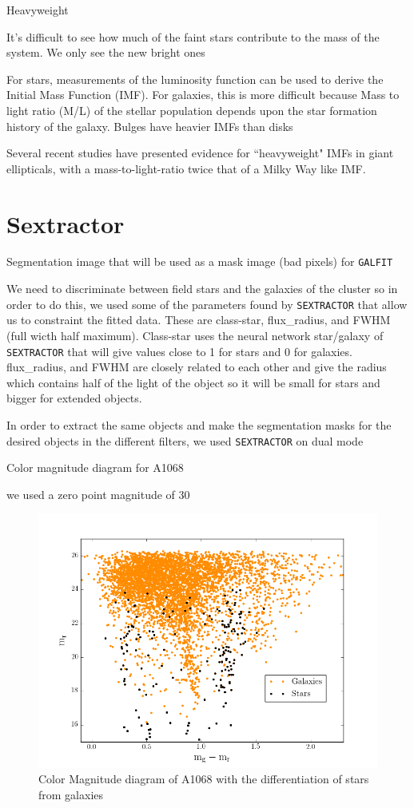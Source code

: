 Heavyweight

It's difficult to see how much of the faint stars contribute to the mass of the system. We only see the new bright ones

For stars, measurements of the luminosity function can be used to derive the Initial Mass Function (IMF). For galaxies, this is more difficult because Mass to light ratio (M/L) of the stellar population depends upon the star formation history of the galaxy. Bulges have heavier IMFs than disks

Several recent studies have presented evidence for ``heavyweight" IMFs in giant ellipticals, with a mass-to-light-ratio twice that of a Milky Way like IMF. 


\section{Sextractor}

Segmentation image that will be used as a mask image (bad pixels) for \texttt{GALFIT}

We need to discriminate between field stars and the galaxies of the cluster so in order to do this, we used some of the parameters found by \texttt{SEXTRACTOR} that allow us to constraint the fitted data. These are class-star, flux\_radius, and FWHM (full wicth half maximum). Class-star uses the neural network star/galaxy of \texttt{SEXTRACTOR} that will give values close to 1 for stars and 0 for galaxies. flux\_radius, and FWHM are closely related to each other and give the radius which contains half of the light of the object so it will be small for stars and bigger for extended objects.

In order to extract the same objects and make the segmentation masks for the desired objects in the different filters, we used \texttt{SEXTRACTOR} on dual mode

Color magnitude diagram for A1068

we used a zero point magnitude of 30

\begin{figure}[H]
\centering
\includegraphics[width=12cm]{images/color_mag.png}
\caption[Color Magnitude diagram of A1068]{Color Magnitude diagram of A1068 with the differentiation of stars from galaxies}
\end{figure}

